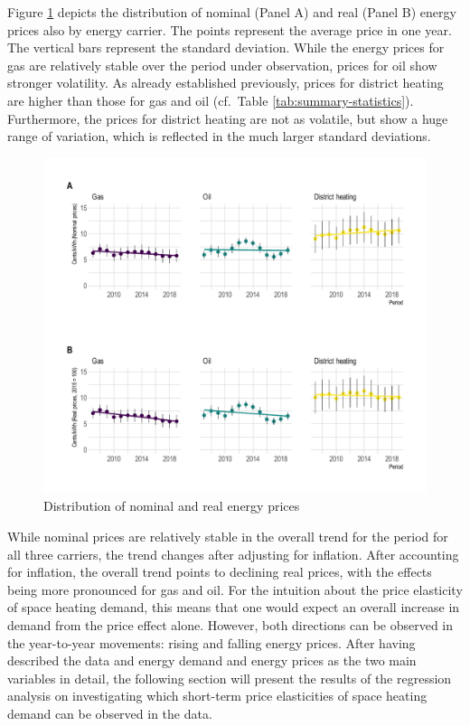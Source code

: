 \documentclass[12pt,twoside]{reedthesis}
\begin{document}
Figure \ref{fig:price-descriptive-graph} depicts the distribution of nominal (Panel A) and real (Panel B) energy prices also by energy carrier. The points represent the average price in one year. The vertical bars represent the standard deviation. While the energy prices for gas are relatively stable over the period under observation, prices for oil show stronger volatility. As already established previously, prices for district heating are higher than those for gas and oil (cf.~Table \ref{tab:summary-statistics}). Furthermore, the prices for district heating are not as volatile, but show a huge range of variation, which is reflected in the much larger standard deviations.
\begin{figure}

{\centering \includegraphics[width=1\linewidth]{figure/prices_descriptive} 

}

\caption{Distribution of nominal and real energy prices}\label{fig:price-descriptive-graph}
\end{figure}
While nominal prices are relatively stable in the overall trend for the period for all three carriers, the trend changes after adjusting for inflation. After accounting for inflation, the overall trend points to declining real prices, with the effects being more pronounced for gas and oil. For the intuition about the price elasticity of space heating demand, this means that one would expect an overall increase in demand from the price effect alone. However, both directions can be observed in the year-to-year movements: rising and falling energy prices. After having described the data and energy demand and energy prices as the two main variables in detail, the following section will present the results of the regression analysis on investigating which short-term price elasticities of space heating demand can be observed in the data.
\end{document}
